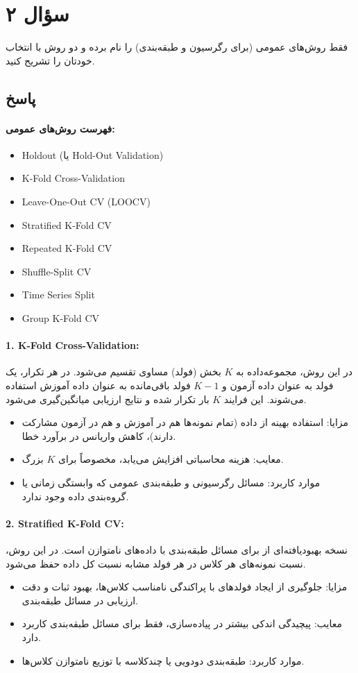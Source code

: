 \documentclass[12pt]{article}
\begin{document}
	\section*{سؤال ۲}
	فقط روش‌های عمومی (برای رگرسیون و طبقه‌بندی) را نام برده و دو روش با انتخاب خودتان را تشریح کنید.
	
	\subsection*{پاسخ}
	\paragraph{فهرست روش‌های عمومی:}
	\begin{itemize}
		\item Holdout (یا Hold-Out Validation)
		\item K-Fold Cross-Validation
		\item Leave-One-Out CV (LOOCV)
		\item Stratified K-Fold CV
		\item Repeated K-Fold CV
		\item Shuffle-Split CV
		\item Time Series Split
		\item Group K-Fold CV
	\end{itemize}
	
	\paragraph{1. K-Fold Cross-Validation:}
	در این روش، مجموعه‌داده به \(K\) بخش (فولد) مساوی تقسیم می‌شود. در هر تکرار، یک فولد به عنوان داده آزمون و \(K-1\) فولد باقی‌مانده به عنوان داده آموزش استفاده می‌شوند. این فرایند \(K\) بار تکرار شده و نتایج ارزیابی میانگین‌گیری می‌شود. 
	\begin{itemize}
		\item مزایا: استفاده بهینه از داده (تمام نمونه‌ها هم در آموزش و هم در آزمون مشارکت دارند)، کاهش واریانس در برآورد خطا.
		\item معایب: هزینه محاسباتی افزایش می‌یابد، مخصوصاً برای \(K\) بزرگ.
		\item موارد کاربرد: مسائل رگرسیونی و طبقه‌بندی عمومی که وابستگی زمانی یا گروه‌بندی داده وجود ندارد.
	\end{itemize}
	
	\paragraph{2. Stratified K-Fold CV:}
	نسخه بهبود‌یافته‌ای از  برای مسائل طبقه‌بندی با داده‌های نامتوازن است. در این روش، نسبت نمونه‌های هر کلاس در هر فولد مشابه نسبت کل داده حفظ می‌شود.
	\begin{itemize}
		\item مزایا: جلوگیری از ایجاد فولدهای با پراکندگی نامناسب کلاس‌ها، بهبود ثبات و دقت ارزیابی در مسائل طبقه‌بندی.
		\item معایب: پیچیدگی اندکی بیشتر در پیاده‌سازی، فقط برای مسائل طبقه‌بندی کاربرد دارد.
		\item موارد کاربرد: طبقه‌بندی دودویی یا چندکلاسه با توزیع نامتوازن کلاس‌ها.
	\end{itemize}
	
\end{document}
